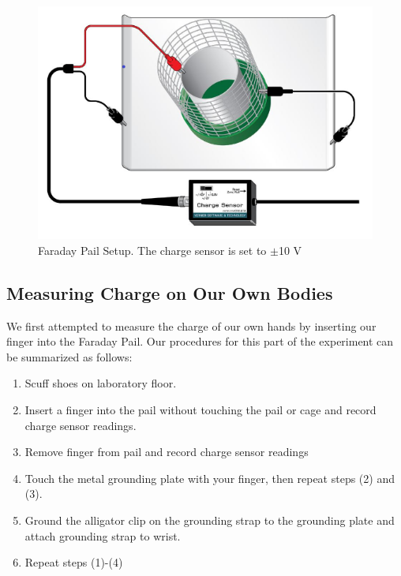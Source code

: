 \documentclass[12pt]{amsart}
\begin{document}
\begin{figure}[h]
	\includegraphics[width=\medgraph,scale=0.01]{FardaySetup.png}
	\caption{Faraday Pail Setup. The charge sensor is set to $\pm$10 V}
	\label{FardaySetup}
\end{figure} 

\subsection{Measuring Charge on Our Own Bodies}
\indent We first attempted to measure the charge of our own hands by inserting our finger into the Faraday Pail. Our procedures for this part of the experiment can be summarized as follows:
\begin{enumerate}
	\item Scuff shoes on laboratory floor.
	\item Insert a finger into the pail without touching the pail or cage and record charge sensor readings.
	\item Remove finger from pail and record charge sensor readings
	\item Touch the metal grounding plate with your finger, then repeat steps (2) and (3).
	\item Ground the alligator clip on the grounding strap to the grounding plate and attach grounding strap to wrist.
	\item Repeat steps (1)-(4)\\
\end{enumerate}
\end{document}
